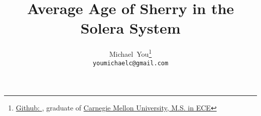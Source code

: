 \usepackage{arxiv}
\usepackage{util}

\usepackage[utf8]{inputenc} %
\usepackage[T1]{fontenc}    %
\usepackage{hyperref}       %
\usepackage{url}            %
\usepackage{booktabs}       %
\usepackage{amsfonts}       %
\usepackage{nicefrac}       %
\usepackage{microtype}      %
\usepackage{lipsum}		%
\usepackage{graphicx}
\usepackage{natbib}
\usepackage{doi}

\title{Average Age of Sherry in the Solera System}

\author{
  Michael~You\thanks{\href{https://github.com/mikinty}{Github: }, graduate of \href{https://www.cmu.edu/}{Carnegie Mellon University, M.S. in ECE}} \\
  \texttt{youmichaelc@gmail.com}
}

\renewcommand{\headeright}{Michael You}
\renewcommand{\undertitle}{}
\renewcommand{\shorttitle}{Sherry Average Age Solera}

